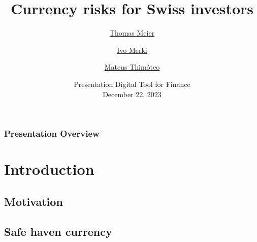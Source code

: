 \documentclass[11pt,]{beamer}
\title[Currency risks]{Currency risks for Swiss investors}
\author[Meier \and Merki \and Thimóteo]{\href{mailto:thomaswilhelm.meier@uzh.ch}{Thomas Meier} \and \href{mailto:ivo.merki@uzh.ch}{Ivo Merki} \and \href{mailto:mateus.siqueirathimoteo@uzh.ch}{Mateus Thimóteo}}
\institute[UZH]{University of Zurich \\ \smallskip}
\date[December 22, 2023]{Presentation Digital Tool for Finance \\December 22, 2023}
\begin{document}
\begin{frame}
	\titlepage
\end{frame}
\begin{frame}
	\frametitle{Presentation Overview}
    \tableofcontents 
\end{frame}
\section{Introduction}
\subsection{Motivation}
\subsection{Safe haven currency}
\end{document}
